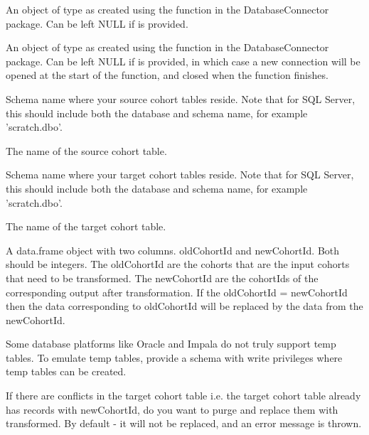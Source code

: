 \documentclass[a4paper]{book}
\begin{document}
\begin{Arguments}
\begin{ldescription}
\item[\code{connectionDetails}] An object of type  as created using the
 function in the
DatabaseConnector package. Can be left NULL if  is
provided.

\item[\code{connection}] An object of type  as created using the
 function in the
DatabaseConnector package. Can be left NULL if 
is provided, in which case a new connection will be opened at the start
of the function, and closed when the function finishes.

\item[\code{sourceCohortDatabaseSchema}] Schema name where your source cohort tables reside. Note that for SQL Server,
this should include both the database and schema name, for example
'scratch.dbo'.

\item[\code{sourceCohortTable}] The name of the source cohort table.

\item[\code{targetCohortDatabaseSchema}] Schema name where your target cohort tables reside. Note that for SQL Server,
this should include both the database and schema name, for example
'scratch.dbo'.

\item[\code{targetCohortTable}] The name of the target cohort table.

\item[\code{oldToNewCohortId}] A data.frame object with two columns. oldCohortId and newCohortId. Both should be integers.
The oldCohortId are the cohorts that are the input cohorts that need to be transformed.
The newCohortId are the cohortIds of the corresponding output after transformation.
If the oldCohortId = newCohortId then the data corresponding to oldCohortId
will be replaced by the data from the newCohortId.

\item[\code{tempEmulationSchema}] Some database platforms like Oracle and Impala do not truly support
temp tables. To emulate temp tables, provide a schema with write
privileges where temp tables can be created.

\item[\code{purgeConflicts}] If there are conflicts in the target cohort table i.e. the target cohort table
already has records with newCohortId, do you want to purge and replace them
with transformed. By default - it will not be replaced, and an error message is thrown.
\end{ldescription}
\end{Arguments}
\end{document}

